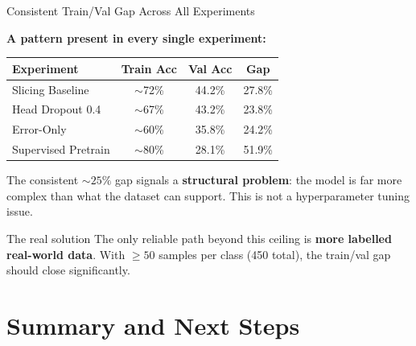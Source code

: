 \documentclass{beamer}
\begin{document}
\begin{frame}{Consistent Train/Val Gap Across All Experiments}

    \textbf{A pattern present in every single experiment:}

    \begin{table}[]
        \centering
        \begin{tabular}{@{}lccc@{}}
            \toprule
            \textbf{Experiment} & \textbf{Train Acc} & \textbf{Val Acc} & \textbf{Gap} \\
            \midrule
            Slicing Baseline      & $\sim$72\% & 44.2\% & \textcolor{myred}{27.8\%} \\
            Head Dropout 0.4      & $\sim$67\% & 43.2\% & \textcolor{myred}{23.8\%} \\
            Error-Only            & $\sim$60\% & 35.8\% & \textcolor{myred}{24.2\%} \\
            Supervised Pretrain   & $\sim$80\% & 28.1\% & \textcolor{myred}{51.9\%} \\
            \bottomrule
        \end{tabular}
    \end{table}

    \vspace{0.2cm}
    The consistent $\sim\!25\%$ gap signals a \textbf{structural problem}: the model is far more complex than what the dataset can support. This is not a hyperparameter tuning issue.

    \vspace{0.2cm}
    \begin{block}{The real solution}
        The only reliable path beyond this ceiling is \textbf{more labelled real-world data}. With $\geq 50$ samples per class (450 total), the train/val gap should close significantly.
    \end{block}
\end{frame}

\section{Summary and Next Steps}
\end{document}
